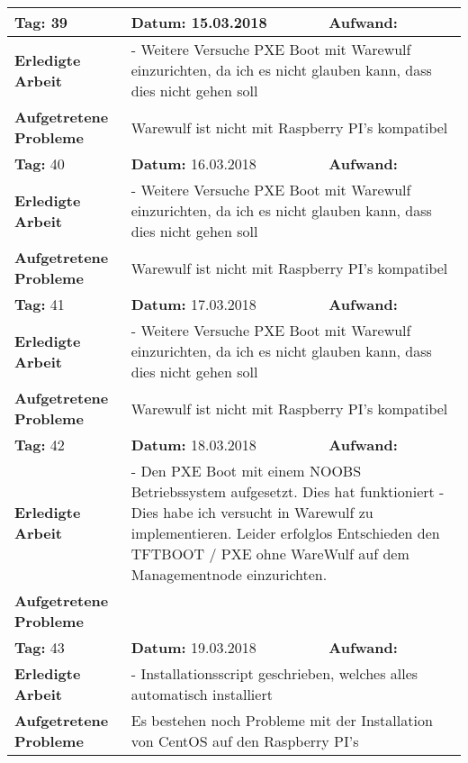 \begin{longtable}{|p{5cm}|p{5cm}|p{6cm}|}
\rowcolor{heading}\textbf{Tag:} 39 & \textbf{Datum:} 15.03.2018 & \textbf{Aufwand:} \\ \hline
\textbf{Erledigte Arbeit} & \multicolumn{2}{p{11cm}|}{- Weitere Versuche PXE Boot mit Warewulf einzurichten, da ich es nicht glauben kann, dass dies nicht gehen soll} \\ \hline
\textbf{Aufgetretene Probleme} & \multicolumn{2}{p{11cm}|}{Warewulf ist nicht mit Raspberry PI's kompatibel} \\ \hline
\rowcolor{heading}\textbf{Tag:} 40 & \textbf{Datum:} 16.03.2018 & \textbf{Aufwand:} \\ \hline
\textbf{Erledigte Arbeit} & \multicolumn{2}{p{11cm}|}{- Weitere Versuche PXE Boot mit Warewulf einzurichten, da ich es nicht glauben kann, dass dies nicht gehen soll} \\ \hline
\textbf{Aufgetretene Probleme} & \multicolumn{2}{p{11cm}|}{Warewulf ist nicht mit Raspberry PI's kompatibel} \\ \hline
\rowcolor{heading}\textbf{Tag:} 41 & \textbf{Datum:} 17.03.2018 & \textbf{Aufwand:} \\ \hline
\textbf{Erledigte Arbeit} & \multicolumn{2}{p{11cm}|}{- Weitere Versuche PXE Boot mit Warewulf einzurichten, da ich es nicht glauben kann, dass dies nicht gehen soll} \\ \hline
\textbf{Aufgetretene Probleme} & \multicolumn{2}{p{11cm}|}{Warewulf ist nicht mit Raspberry PI's kompatibel} \\ \hline
\rowcolor{heading}\textbf{Tag:} 42 & \textbf{Datum:} 18.03.2018 & \textbf{Aufwand:} \\ \hline
\textbf{Erledigte Arbeit} & \multicolumn{2}{p{11cm}|}{- Den PXE Boot mit einem NOOBS Betriebssystem aufgesetzt. Dies hat funktioniert \newline
- Dies habe ich versucht in Warewulf zu implementieren. Leider erfolglos \newline
Entschieden den TFTBOOT / PXE ohne WareWulf auf dem Managementnode einzurichten.} \\ \hline
\textbf{Aufgetretene Probleme} & \multicolumn{2}{p{11cm}|}{} \\ \hline
\rowcolor{heading}\textbf{Tag:} 43 & \textbf{Datum:} 19.03.2018 & \textbf{Aufwand:} \\ \hline
\textbf{Erledigte Arbeit} & \multicolumn{2}{p{11cm}|}{- Installationsscript geschrieben, welches alles automatisch installiert} \\ \hline
\textbf{Aufgetretene Probleme} & \multicolumn{2}{p{11cm}|}{Es bestehen noch Probleme mit der Installation von CentOS auf den Raspberry PI's} \\ \hline

\end{longtable}
